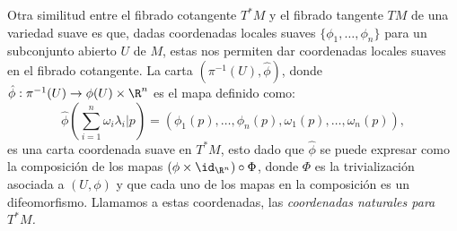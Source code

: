 Otra similitud entre el fibrado cotangente $T^{*}M$ y el fibrado tangente $TM$ de una variedad suave es que, dadas coordenadas locales suaves $\{\phi_1,\ldots,\phi_n\}$ para un subconjunto abierto $U$ de $M$, estas nos permiten dar coordenadas locales suaves en el fibrado cotangente. La carta $(\pi^{-1}(U), \hat{\phi})$, donde $\hat{\phi}: \pi^{-1}(U) \to \phi(U) \times \R^n$ es el mapa definido como:
\[
  \hat{\phi} \left(\sum_{i=1}^{n} \omega_i \lambda_i |p \right) 
  = \left(\phi_1(p), \ldots, \phi_n(p), \omega_1(p), \ldots, \omega_n(p) \right),
\]
es una carta coordenada suave en $T^{*}M$, esto dado que $\hat{\phi}$ se puede expresar como la composición de los mapas $(\phi \times \id_{\R^n}) \circ \Phi$, donde $\Phi$ es la trivialización asociada a $(U,\phi)$ y que cada uno de los mapas en la composición es un difeomorfismo. Llamamos a estas coordenadas, las \it{coordenadas naturales para $T^{*}M$}.
